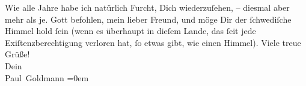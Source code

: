 \begin{ledgroupsized}[t]{13cm}
           \pstart
           Wie alle Jahre habe ich natürlich Furcht, Dich {\pb}wiederzuſehen, – diesmal aber mehr als je.\pend
           \pstart
           Gott befohlen, mein lieber Freund, und möge Dir der ſchwediſche Himmel hold ſein (wenn es
               überhaupt in dieſem Lande,
               das ſeit \label{K_L02780-4v}\label{K_L02780-4h} jede Exiſtenzberechtigung verloren hat, ſo etwas gibt, wie einen Himmel).\pend
           \pstart
           Viele treue Grüße! {\\[\baselineskip]}Dein {\\[\baselineskip]}\spacefill\mbox{Paul Goldmann}\pend
           \leftskip=0em{}
         
         \endnumbering{}\end{ledgroupsized}  \newcommand{\dateiname}{L02780}\newcommand{\titel}{Paul Goldmann an Arthur Schnitzler, 4. 7. [1896]}\newcommand{\editorInnen}{Martin Anton Müller und Laura Untner}
      